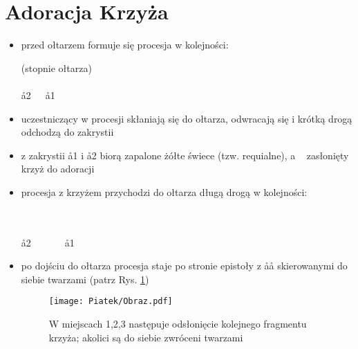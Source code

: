 \section{Adoracja Krzyża}

\begin{itemize}
      \item przed ołtarzem formuje się procesja w kolejności:

            \begin{center}
                  (stopnie ołtarza) \smallskip\\
                  ~~~\ii~~~~ \smallskip\\
                  \aa2~~~\aa1 \smallskip\\
                  \downarrow
            \end{center}

      \item uczestniczący w procesji skłaniają się do ołtarza, odwracają się i
            krótką drogą odchodzą do zakrystii
      \item z zakrystii \aa1 i \aa2 biorą zapalone {\color{orange} żółte} świece
            (tzw. requialne), a \ii~ zasłonięty krzyż do adoracji
      \item procesja z krzyżem przychodzi do ołtarza długą drogą w kolejności:

            \begin{center}
                  \uparrow \smallskip\\
                  ~~~ \smallskip\\
                  \aa2~~~\ii~~~~\aa1\smallskip\\
            \end{center}

      \item po dojściu do ołtarza procesja staje po stronie epistoły z \aa\aa
            skierowanymi do siebie twarzami (patrz Rys. \ref{fig:crux})

            \begin{figure}[h]
                  \centering
                  \texttt{[image: Piatek/Obraz.pdf]}
                  \caption{W miejscach 1,2,3 następuje odsłonięcie kolejnego
                        fragmentu krzyża; akolici są do siebie zwróceni
                        twarzami}
                  \label{fig:crux}
            \end{figure}


\end{itemize}
